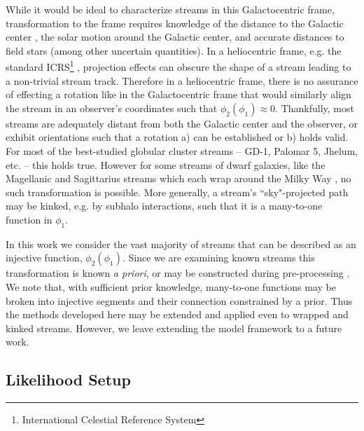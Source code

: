 \documentclass[twocolumn, linenumbers]{aastex631}
\newcommand{\stream}[1]{#1}
\begin{document}
        While it would be ideal to characterize streams in this Galactocentric
        frame, transformation to the frame requires knowledge of the distance to
        the Galactic center  \citep{GRAVITY2018, BennettBovy2019, Leung+2022},
        the solar motion around the Galactic center, and accurate distances to
        field stars (among other uncertain quantities). In a heliocentric frame,
        e.g. the standard ICRS\footnote{International Celestial Reference
        System} \citep{ICRS1997}, projection effects can obscure the shape of a
        stream leading to a non-trivial stream track. Therefore in a
        heliocentric frame, there is no assurance of effecting a rotation like
        in the Galactocentric frame that would similarly align the stream in an
        observer's coordinates such that $\phi_2(\phi_1) \approx 0$.
        Thankfully, most streams are adequately distant from both the Galactic
        center and the observer, or exhibit orientations such that a rotation a)
        can be established or b) holds valid. For most of the best-studied
        globular cluster streams -- \stream{GD-1}, \stream{Palomar 5},
        \stream{Jhelum}, etc. -- this holds true. However for some streams of
        dwarf galaxies, like the Magellanic and Sagittarius streams which each
        wrap around the Milky Way \citep{Newberg+2002, Majewski+2003,
        WannierWrixon1972}, no such transformation is possible. More generally,
        a stream's ``sky"-projected path may be kinked, e.g. by subhalo
        interactions, such that it is a many-to-one function in $\phi_1$.

        In this work we consider the vast majority of streams that can be
        described as an injective function, $\phi_2(\phi_1)$.  Since we are
        examining known streams this transformation is known \textit{a priori},
        or may be constructed during pre-processing
        \citep[see][\S2.1]{Starkman+2023}.  We note that, with sufficient prior
        knowledge, many-to-one functions may be broken into injective segments
        and their connection constrained by a prior. Thus the methods developed
        here may be extended and applied even to wrapped and kinked streams.
        However, we leave extending the model framework to a future work.


    \subsection{Likelihood Setup}\label{sub:method:likelihood_setup}
\end{document}
